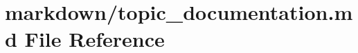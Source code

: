 \hypertarget{topic__documentation_8md}{}\section{markdown/topic\+\_\+documentation.md File Reference}
\label{topic__documentation_8md}
